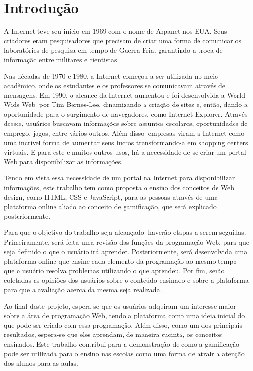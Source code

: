 \chapter[Introdução]{Introdução}
\label{cap:introducao}

A Internet teve seu início em 1969 com o nome de Arpanet nos EUA. Seus criadores eram pesquisadores que precisam de criar uma forma de comunicar os laboratórios de pesquisa em tempo de Guerra Fria, garantindo a troca de informação entre militares e cientistas. \cite{folha} 

Nas décadas de 1970 e 1980, a Internet começou a ser utilizada no meio acadêmico, onde os estudantes e os professores se comunicavam através de mensagens. Em 1990, o alcance da Internet aumentou e foi desenvolvida a World Wide Web, por Tim Bernes-Lee, dinamizando a criação de sites e, então, dando a oportunidade para o surgimento de navegadores, como Internet Explorer. Através desses, usuários buscavam informações sobre assuntos escolares, oportunidades de emprego, jogos, entre vários outros. Além disso, empresas viram a Internet como uma incrível forma de aumentar seus lucros transformando-a em shopping centers virtuais. \cite{internet} E para este e muitos outros usos, há a necessidade de se criar um portal Web para disponibilizar as informações.

Tendo em vista essa necessidade de um portal na Internet para disponibilizar informações, este trabalho tem como proposta o ensino dos conceitos de Web design, como HTML, CSS e JavaScript, para as pessoas através de uma plataforma online aliado ao conceito de gamificação, que será explicado posteriormente. 

Para que o objetivo do trabalho seja alcançado, haverão etapas a serem seguidas. Primeiramente, será feita uma revisão das funções da programação Web, para que seja definido o que o usuário irá aprender. Posteriormente, será desenvolvida uma plataforma online que ensine cada elemento da programação ao mesmo tempo que o usuário resolva problemas utilizando o que aprendeu. Por fim, serão coletadas as opiniões dos usuários sobre o conteúdo ensinado e sobre a plataforma para que a avaliação acerca da mesma seja realizada.

Ao final deste projeto, espera-se que os usuários adquiram um interesse maior sobre a área de programação Web, tendo a plataforma como uma ideia inicial do que pode ser criado com essa programação. Além disso, como um dos principais resultados, espera-se que eles aprendam, de maneira sucinta, os conceitos ensinados. Este trabalho contribui para a demonstração de como a gamificação pode ser utilizada para o ensino nas escolas como uma forma de atrair a atenção dos alunos para as aulas.
